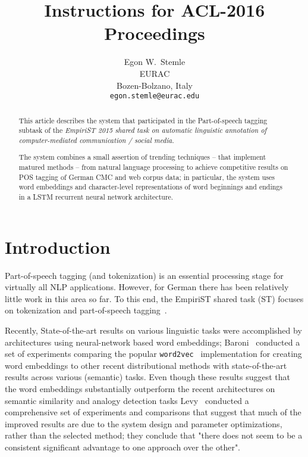 \documentclass[11pt]{article}
\title{Instructions for ACL-2016 Proceedings}
\author{Egon W.~Stemle \\
  EURAC \\
  Bozen-Bolzano, Italy \\
  {\tt egon.stemle@eurac.edu}} %
\date{}
\begin{document}
\maketitle
\begin{abstract}
    This article describes the system that participated in the Part-of-speech
    tagging subtask of the \emph{EmpiriST 2015 shared task on automatic
    linguistic annotation of computer-mediated communication / social
    media}.

    The system combines a small assertion of trending techniques -- that
    implement matured methods -- from natural language processing to achieve
    competitive results on POS tagging of German CMC and web corpus data; 
    in particular, the system uses word embeddings and character-level representations of word beginnings and endings in a LSTM recurrent neural
    network architecture.

    
\end{abstract}

\section{Introduction}
\label{sec:intro}

Part-of-speech tagging (and tokenization) is an essential processing stage for virtually all NLP applications. However, for German there has been relatively little work in this area so far. To this end, the EmpiriST shared task (ST) focuses on tokenization and part-of-speech tagging~\cite{empirist2016}.

Recently, State-of-the-art results on various linguistic tasks were accomplished by architectures using neural-network based word embeddings; Baroni~ conducted a set of experiments comparing the popular \texttt{word2vec}~\cite{DBLP:journals/corr/abs-1301-3781,arXiv:1310.4546} implementation for creating word embeddings to other recent distributional methods with state-of-the-art results across various (semantic) tasks.
Even though these results suggest that the word embeddings substantially outperform the recent architectures on semantic similarity and analogy detection tasks Levy~ conducted a comprehensive set of experiments and comparisons that suggest that much of the improved results are due to the system design and parameter optimizations, rather than the selected method;
they conclude that "there does not seem to be a consistent significant advantage to one approach over the other".
\end{document}
